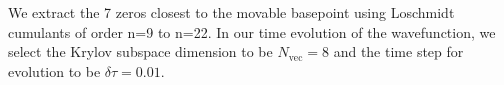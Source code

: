 \documentclass[%
reprint,
superscriptaddress,
amsmath,amssymb,
aps,
pra,
floatfix,
]{revtex4-1}
\begin{document}
%
%

We extract the 7 zeros closest to the movable basepoint using Loschmidt cumulants of order n=9 to n=22.
In our time evolution of the wavefunction, we select the Krylov subspace dimension to be $N_{\text{vec}} = 8$ and the time step for evolution to be $\delta \tau = 0.01$.
\end{document}
